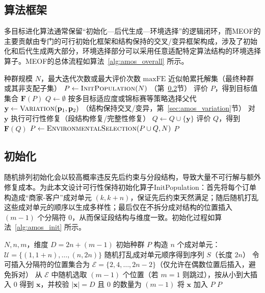 \subsection{算法框架}
多目标进化算法通常保留“初始化—后代生成—环境选择”的逻辑闭环，而MEOF的主要贡献由专门的可行初始化框架和结构保持的交叉/变异框架构成，涉及了初始化和后代生成两大部分，环境选择部分可以采用任意适配特定算法结构的环境选择算子。MEOF的总体流程如算法~\ref{alg:amos_overall} 所示。

\begin{algorithm}[H]
	\caption{MEOF}
	\label{alg:amos_overall}
	\begin{algorithmic}[1]
		\REQUIRE 种群规模 $N$，最大迭代次数或最大评价次数 $\mathrm{maxFE}$
		\ENSURE 近似帕累托解集（最终种群或其非支配子集）
		\STATE $P \leftarrow \textsc{InitPopulation}(N)$ \hfill（第~\ref{sec:amos_init}节）
		\STATE 评价 $P$，得到目标值集合 $\mathbf{F}(P)$
		\STATE $Q \leftarrow \emptyset$
		\STATE 按多目标适应度或锦标赛等策略选择父代
		\STATE $\mathbf{y} \leftarrow \textsc{Variation}(\mathbf{p}_1,\mathbf{p}_2)$ \hfill（结构保持交叉/变异，第~\ref{sec:amos_variation}节）
		\STATE 对 $\mathbf{y}$ 执行可行性修复（段结构修复/完整性修复）
		\STATE $Q \leftarrow Q \cup \{\mathbf{y}\}$
		\ENDFOR
		\STATE 评价 $Q$，得到 $\mathbf{F}(Q)$
		\STATE $P \leftarrow \textsc{EnvironmentalSelection}(P\cup Q, N)$ \hfill
		\ENDWHILE
		\RETURN $P$
	\end{algorithmic}
\end{algorithm}




\subsection{初始化}
\label{sec:amos_init}

随机排列初始化会以较高概率违反先后约束与分段结构，导致大量不可行解与额外修复成本。为此本文设计可行性保持初始化算子InitPopulation：首先将每个订单构造成“商家-客户”成对单元 $(k, k+n)$，保证先后约束天然满足；随后随机打乱这些成对单元的顺序以生成多样性；最后仅在不拆分成对结构的位置插入 $(m-1)$ 个分隔符 $0$，从而保证段结构与维度一致。初始化过程如算法~\ref{alg:amos_init} 所示。

\begin{algorithm}[H]
	\caption{InitPopulation}
	\label{alg:amos_init}
	\begin{algorithmic}[1]
		\REQUIRE $N,n,m$，维度 $D=2n+(m-1)$
		\ENSURE 初始种群 $P$
		\STATE 构造 $n$ 个成对单元：$\mathcal{U}=\{(1,1+n),\ldots,(n,2n)\}$
		\STATE 随机打乱成对单元顺序得到序列 $S$（长度 $2n$）
		\STATE 令可插入分隔符的位置集合为 $\mathcal{E}=\{2,4,\ldots,2n-2\}$（仅允许在偶数位置后插入，避免拆对）
		\STATE 从 $\mathcal{E}$ 中随机选取 $(m-1)$ 个位置（若 $m=1$ 则跳过），按从小到大插入 $0$
		\STATE 得到 $\mathbf{x}$，并校验 $|\mathbf{x}|=D$ 且 $0$ 的数量为 $(m-1)$
		\STATE 将 $\mathbf{x}$ 加入 $P$
		\ENDFOR
		\RETURN $P$
	\end{algorithmic}
\end{algorithm}


